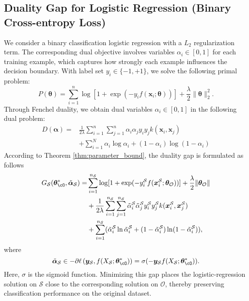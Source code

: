 \subsection{Duality Gap for Logistic Regression (Binary Cross-entropy Loss)}
We consider a binary classification logistic regression with a $L_2$ regularization term. The corresponding dual objective involves variables $\alpha_i \in [0,1]$ for each training example, which captures how strongly each example influences the decision boundary.
With label set $y_i \in \{-1,+1\}$, we solve the following primal problem:
\begin{equation*}
\label{lr-theta-opt}
  P(\bm \theta) =  \sum_{i=1}^n \log[1+\exp(-y_i f( \boldsymbol{x}_i;\boldsymbol{\theta}))] + \frac{\lambda}{2} \|\boldsymbol{\theta}\|_2^2.
\end{equation*}
Through Fenchel duality, we obtain dual variables $\alpha_i \in [0,1]$ in the following dual problem:
\begin{equation*}
\begin{aligned}
D(\bm \alpha) =  &\frac{1}{2\lambda}\sum_{i=1}^{n}\sum_{j=1}^{n} \alpha_i\alpha_j y_iy_jk(\boldsymbol{x}_i,\boldsymbol{x}_j) \\ & + \sum_{i=1}^{N} \alpha_i \log \alpha_i + (1 - \alpha_i) \log(1 - \alpha_i)
\end{aligned}
\end{equation*}
According to Theorem  \ref{thm:parameter_bound}, the duality gap is formulated as follows 
\begin{equation*}
  \begin{aligned}
G_{\mathcal{S}}(\bm \theta_{\cO}^*,\tilde{\boldsymbol{\alpha}}_\mathcal{S}) = & \sum_{i=1}^{n_{\mathcal{S}}} \log[1+\exp(-y_i^\mathcal{S} f(\boldsymbol{x}_i^\mathcal{S}; \boldsymbol{\theta}_\mathcal{O}))] + \frac{\lambda}{2}\|\boldsymbol{\theta}_\mathcal{O}\|\\
& +\frac{1}{2\lambda}\sum_{i=1}^{n_\mathcal{S}} \sum_{j=1}^{n_\mathcal{S}} \tilde{\alpha}_i^\mathcal{S} \tilde{\alpha}_j^\mathcal{S}  y_i^\mathcal{S} y_j^\mathcal{S} k(\boldsymbol{x}_i^\mathcal{S},\boldsymbol{x}_j^\mathcal{S})\\
& +\sum_{i=1}^{n_{\mathcal{S}}}(\tilde{\alpha}_i^\mathcal{S}\ln\tilde{\alpha}_i^\mathcal{S} + (1-\tilde{\alpha}_i^\mathcal{S})\ln(1-\tilde{\alpha}_i^\mathcal{S})),
  \end{aligned}
\end{equation*}
where
\begin{equation*}
\tilde{\boldsymbol{\alpha}}_{\mathcal{S}} \in -\partial \ell\left(\boldsymbol{y}_\mathcal{S}, f (X_\mathcal{S};  \bm \theta_{\cO}^*)\right)= \sigma(-\boldsymbol{y}_\mathcal{S} f(X_\mathcal{S}; \bm \theta_{\cO}^*)).
\end{equation*}
Here, $\sigma$ is the sigmoid function. Minimizing this gap places the logistic-regression solution on $\mathcal{S}$ close to the corresponding solution on $\mathcal{O}$, thereby preserving classification performance on the original dataset. 

